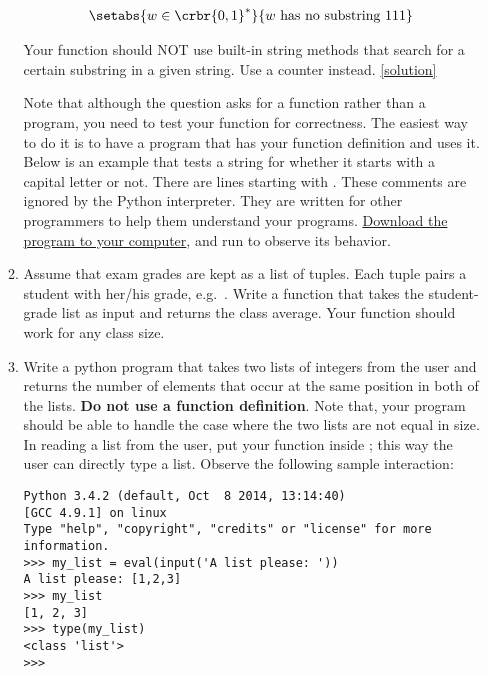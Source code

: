 \documentclass[a4paper]{article}
\begin{document}
\begin{itemize}
\begin{uexercise}
\begin{enumerate}
\begin{align*}
\setabs{w\in \crbr{0,1}^*}{w \text{ has no substring }111}
\end{align*}

Your function should NOT use built-in string methods that search for a certain
substring in a given string. Use a counter instead. \href{https://github.com/umutozge/prog-book/blob/master/code/cartesian-product.py}{[solution]}

Note that although the question asks for a function rather than a program, you
need to test your function for correctness. The easiest way to do it is to have
a program that has your function definition and uses it. Below is an example
that tests a string for whether it starts with a capital letter or not. There
are lines starting with \pyv{#}. These comments are ignored by the Python
interpreter. They are written for other programmers to help them understand your
programs.
\href{https://github.com/umutozge/prog-book/blob/master/code/func-prog-ex.py?dl=0}{Download
the program to your computer}, and run to observe its behavior.

\begin{ucodeframe}
\footnotesize
{}
\end{ucodeframe}

\item Assume that exam grades are kept as a list of tuples. Each tuple pairs
a student with her/his grade, e.g.\ .
Write a function that takes the student-grade list as input and returns the
class average. Your function should work for any class size.


\item Write a python program that takes two lists of integers from the user
and returns the number of elements that occur at the same position in both of
the lists. {\bf Do not use a function definition}. Note that, your program
should be able to handle the case where the two lists are not equal in size. 
In reading a list from the user, put your  function inside
; this way the user can directly type a list. Observe the following
sample interaction:


\begin{ucodeframe}
\footnotesize
\begin{Verbatim}
Python 3.4.2 (default, Oct  8 2014, 13:14:40) 
[GCC 4.9.1] on linux
Type "help", "copyright", "credits" or "license" for more information.
>>> my_list = eval(input('A list please: '))
A list please: [1,2,3]
>>> my_list
[1, 2, 3]
>>> type(my_list)
<class 'list'>
>>> 
\end{Verbatim}
\end{ucodeframe}



\end{enumerate}
\end{uexercise}
\end{itemize}
\end{document}
